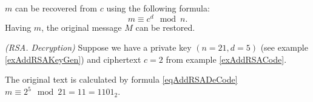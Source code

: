 $m$ can be recovered from $c$ using the following formula:
\begin{equation}
m \equiv c^d \mod{n}.
\label{eqAddRSADeCode}
\end{equation}
Having $m$, the original message $M$ can be restored.
\begin{example}
\emph{(RSA. Decryption)}
Suppose we have a private key $\left(n=21, d=5\right)$ (see example \ref{exAddRSAKeyGen}) and ciphertext $c = 2$ from example \ref{exAddRSACode}.

The original text is calculated by formula \eqref{eqAddRSADeCode} $m \equiv 2^5 \mod{21} = 11 = 1101_2$.
\label{exAddRSADeCode}
\end{example}